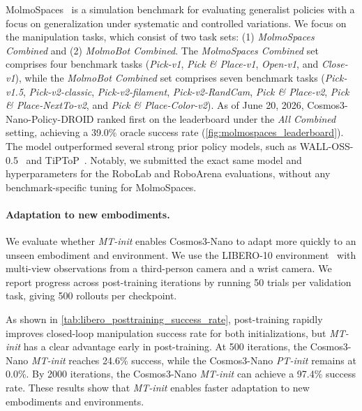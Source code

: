 

MolmoSpaces~\citep{kim:arxiv2026} is a simulation benchmark for evaluating generalist policies with a focus on generalization under systematic and controlled variations. We focus on the manipulation tasks, which consist of two task sets: (1) \textit{MolmoSpaces Combined} and (2) \textit{MolmoBot Combined}. The \textit{MolmoSpaces Combined} set comprises four benchmark tasks (\textit{Pick-v1}, \textit{Pick \& Place-v1}, \textit{Open-v1}, and \textit{Close-v1}), while the \textit{MolmoBot Combined} set comprises seven benchmark tasks (\textit{Pick-v1.5}, \textit{Pick-v2-classic}, \textit{Pick-v2-filament}, \textit{Pick-v2-RandCam}, \textit{Pick \& Place-v2}, \textit{Pick \& Place-NextTo-v2}, and \textit{Pick \& Place-Color-v2}). As of June 20, 2026, Cosmos3-Nano-Policy-DROID ranked first on the leaderboard under the \textit{All Combined} setting, achieving a 39.0\% oracle success rate (\cref{fig:molmospaces_leaderboard}). The model outperformed several strong prior policy models, such as WALL-OSS-0.5~\citep{zhai:arxiv2025} and TiPToP~\citep{shen:arxiv2026}. Notably, we submitted the exact same model and hyperparameters for the RoboLab and RoboArena evaluations, without any benchmark-specific tuning for MolmoSpaces.



\paragraph{Adaptation to new embodiments.}
We evaluate whether \textit{MT-init} enables Cosmos3-Nano to adapt more quickly to an unseen embodiment and environment.
We use the LIBERO-10 environment~\citep{liu2023libero} with multi-view observations from a third-person camera and a wrist camera.
We report progress across post-training iterations by running 50 trials per validation task, giving 500 rollouts per checkpoint.

As shown in \cref{tab:libero_posttraining_success_rate}, post-training rapidly improves closed-loop manipulation success rate for both initializations, but \textit{MT-init} has a clear advantage early in post-training.
At 500 iterations, the Cosmos3-Nano \textit{MT-init} reaches 24.6\% success, while the Cosmos3-Nano \textit{PT-init} remains at 0.0\%.
By 2000 iterations, the Cosmos3-Nano \textit{MT-init} can achieve a 97.4\% success rate.
These results show that \textit{MT-init} enables faster adaptation to new embodiments and environments.

